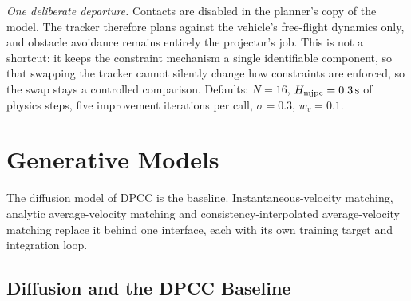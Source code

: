 \emph{One deliberate departure.} Contacts are disabled in the planner's copy of the model. The
tracker therefore plans against the vehicle's free-flight dynamics only, and obstacle avoidance
remains entirely the projector's job. This is not a shortcut: it keeps the constraint mechanism a
single identifiable component, so that swapping the tracker cannot silently change how constraints
are enforced, so the swap stays a controlled comparison.
Defaults: $N = 16$, $H_{\textrm{mjpc}} = 0.3\,\textrm{s}$ of physics steps, five improvement iterations
per call, $\sigma = 0.3$, $w_{v} = 0.1$.


\section{Generative Models}\label{sec:method:engine}

The diffusion model of \ac{DPCC} is the baseline. Instantaneous-velocity matching, analytic
average-velocity matching and consistency-interpolated average-velocity matching replace it
behind one interface, each with its own training target and integration loop.

\subsection{Diffusion and the DPCC Baseline}\label{sec:method:diffusion}

